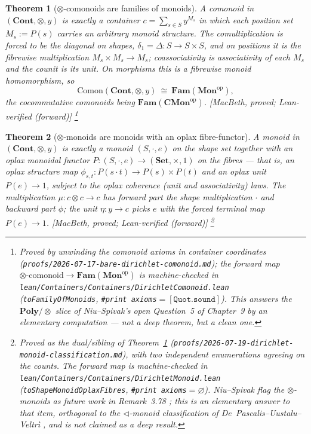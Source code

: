\documentclass[11pt,a4paper]{book}
\newcommand{\Set}{\mathbf{Set}}
\newcommand{\Cont}{\mathbf{Cont}}
\newcommand{\Poly}{\mathbf{Poly}}
\newcommand{\Fam}{\mathbf{Fam}}
\newcommand{\op}{^{\mathrm{op}}}
\theoremstyle{plain}
\newtheorem{Theorem}{Theorem}[chapter]
\theoremstyle{definition}
\theoremstyle{remark}
\newcommand{\prov}[1]{\hfill\textsf{\footnotesize[#1]}}
\begin{document}
\begin{Theorem}[$\otimes$-comonoids are families of monoids]
\label{thm:dir-comonoid}
A comonoid in $(\Cont,\otimes,y)$ is exactly a container $c=\sum_{s\in S}y^{M_s}$
in which each position set $M_s:=P(s)$ carries an \emph{arbitrary} monoid
structure. The comultiplication is forced to be the diagonal on shapes,
$\delta_1=\Delta\colon S\to S\times S$, and on positions it is the fibrewise
multiplication $M_s\times M_s\to M_s$; coassociativity is associativity of each
$M_s$ and the counit is its unit. On morphisms this is a fibrewise monoid
homomorphism, so
\[
  \mathrm{Comon}(\Cont,\otimes,y)\ \cong\ \Fam(\mathbf{Mon}\op),
\]
the cocommutative comonoids being $\Fam(\mathbf{CMon}\op)$.
\prov{MacBeth, proved; Lean-verified (forward)}%
\footnote{Proved by unwinding the comonoid axioms in container coordinates
(\texttt{proofs/2026-07-17-bare-dirichlet-comonoid.md}); the forward map
$\otimes\text{-comonoid}\to\Fam(\mathbf{Mon}\op)$ is machine-checked in
\texttt{lean/Containers/Containers/DirichletComonoid.lean}
(\texttt{toFamilyOfMonoids}, \texttt{\#print axioms}${}=[\mathtt{Quot.sound}]$).
This answers the $\Poly/\otimes$ slice of Niu--Spivak's open Question~5
of Chapter~9 \cite{NiuSpivak23} by an elementary computation --- not a deep
theorem, but a clean one.}
\end{Theorem}

\begin{Theorem}[$\otimes$-monoids are monoids with an oplax fibre-functor]
\label{thm:dir-monoid}
A monoid in $(\Cont,\otimes,y)$ is exactly a monoid $(S,\cdot,e)$ on the shape set
together with an \emph{oplax monoidal functor}
$P\colon(S,\cdot,e)\to(\Set,\times,1)$ on the fibres --- that is, an oplax
structure map $\phi_{s,t}\colon P(s\cdot t)\to P(s)\times P(t)$ and an oplax unit
$P(e)\to 1$, subject to the oplax coherence (unit and associativity) laws. The
multiplication $\mu\colon c\otimes c\to c$ has forward part the shape
multiplication $\cdot$ and backward part $\phi$; the unit $\eta\colon y\to c$
picks $e$ with the forced terminal map $P(e)\to 1$.
\prov{MacBeth, proved; Lean-verified (forward)}%
\footnote{Proved as the dual/sibling of Theorem~\ref{thm:dir-comonoid}
(\texttt{proofs/2026-07-19-dirichlet-monoid-classification.md}), with two
independent enumerations agreeing on the counts. The forward map is
machine-checked in \texttt{lean/Containers/Containers/DirichletMonoid.lean}
(\texttt{toShapeMonoidOplaxFibres}, \texttt{\#print axioms}${}=\varnothing$).
Niu--Spivak flag the $\otimes$-monoids as future work in Remark~3.78
\cite{NiuSpivak23}; this is an elementary answer to that item, orthogonal to the
$\triangleleft$-monoid classification of De~Pascalis--Uustalu--Veltr\`i
\cite{DUV}, and is not claimed as a deep result.}
\end{Theorem}
\end{document}
